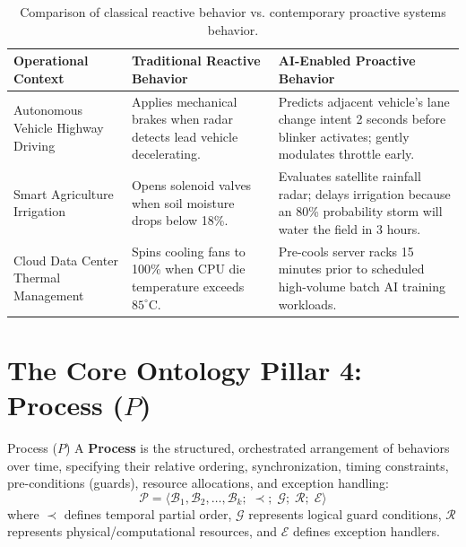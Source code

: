 \begin{table}[htbp]
\centering
\small
\renewcommand{\arraystretch}{1.3}
\begin{tabularx}{\textwidth}{p{3.5cm}p{5.5cm}X}
\toprule
\textbf{Operational Context} & \textbf{Traditional Reactive Behavior} & \textbf{AI-Enabled Proactive Behavior} \\
\midrule
Autonomous Vehicle Highway Driving & Applies mechanical brakes when radar detects lead vehicle decelerating. & Predicts adjacent vehicle's lane change intent 2 seconds before blinker activates; gently modulates throttle early. \\
Smart Agriculture Irrigation & Opens solenoid valves when soil moisture drops below 18\%. & Evaluates satellite rainfall radar; delays irrigation because an 80\% probability storm will water the field in 3 hours. \\
Cloud Data Center Thermal Management & Spins cooling fans to 100\% when CPU die temperature exceeds $85^\circ\text{C}$. & Pre-cools server racks 15 minutes prior to scheduled high-volume batch AI training workloads. \\
\bottomrule
\end{tabularx}
\caption{Comparison of classical reactive behavior vs. contemporary proactive systems behavior.}
\label{tab:reactive_vs_proactive}
\end{table}

\section{The Core Ontology Pillar 4: Process (\texorpdfstring{$P$}{P})}
\label{sec:ontology_process}

\begin{definitionbox}{Process ($P$)}
A \textbf{Process} is the structured, orchestrated arrangement of behaviors over time, specifying their relative ordering, synchronization, timing constraints, pre-conditions (guards), resource allocations, and exception handling:
\begin{equation}
    \mathcal{P} = \Big\langle \mathcal{B}_1, \mathcal{B}_2, \dots, \mathcal{B}_k; \; \prec; \; \mathcal{G}; \; \mathcal{R}; \; \mathcal{E} \Big\rangle
\end{equation}
where $\prec$ defines temporal partial order, $\mathcal{G}$ represents logical guard conditions, $\mathcal{R}$ represents physical/computational resources, and $\mathcal{E}$ defines exception handlers.
\end{definitionbox}

